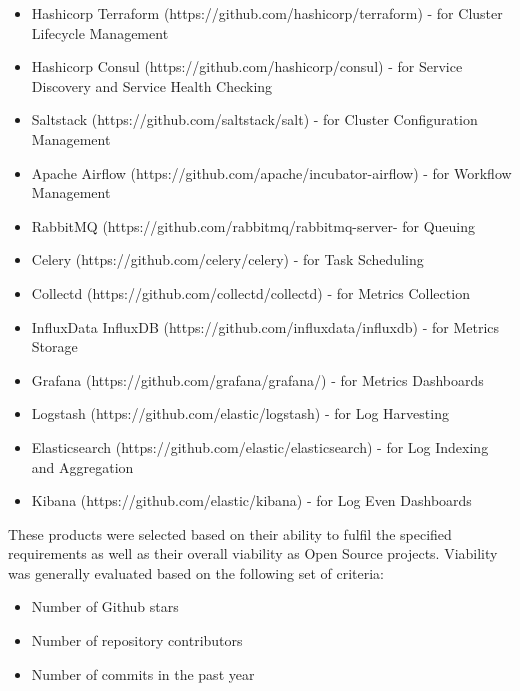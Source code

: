 \begin{itemize}
\item Hashicorp Terraform\autocite{Terraform_by_HashiCorp_2016-10-31} (https://github.com/hashicorp/terraform) - for Cluster Lifecycle Management
\item Hashicorp Consul\autocite{Consul_by_HashiCorp} (https://github.com/hashicorp/consul) - for Service Discovery and Service Health Checking
\item Saltstack\autocite{SaltStack_2016-10-31} (https://github.com/saltstack/salt) - for Cluster Configuration Management
\item Apache Airflow\autocite{Apache_Airflow__2016-10-31} (https://github.com/apache/incubator-airflow) - for Workflow Management
\item RabbitMQ\autocite{RabbitMQ_2016-10-31} (https://github.com/rabbitmq/rabbitmq-server- for Queuing
\item Celery\autocite{Celery_2016-10-31} (https://github.com/celery/celery) - for Task Scheduling
\item Collectd\autocite{collectd_2016-10-31} (https://github.com/collectd/collectd) - for Metrics Collection
\item InfluxData InfluxDB\autocite{InfluxDB} (https://github.com/influxdata/influxdb) - for Metrics Storage
\item Grafana\autocite{Grafana.net} (https://github.com/grafana/grafana/) - for Metrics Dashboards
\item Logstash\autocite{Logstash} (https://github.com/elastic/logstash) - for Log Harvesting
\item Elasticsearch\autocite{Elasticsearch} (https://github.com/elastic/elasticsearch) - for Log Indexing and Aggregation
\item Kibana\autocite{Kibana} (https://github.com/elastic/kibana) - for Log Even Dashboards
\end{itemize}

These products were selected based on their ability to fulfil the specified requirements as well as their overall viability as Open Source projects. Viability was generally evaluated based on the following set of criteria:

\begin{itemize}
\item Number of Github stars
\item Number of repository contributors
\item Number of commits in the past year
\end{itemize}

